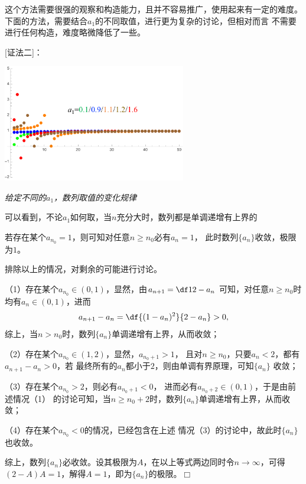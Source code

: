 这个方法需要很强的观察和构造能力，且并不容易推广，使用起来有一定的难度。
下面的方法，需要结合$a_1$的不同取值，进行更为复杂的讨论，但相对而言
不需要进行任何构造，难度略微降低了一些。

[证法二]：
\begin{center}
	\includegraphics[width=8cm]{./images/ch1/a2a.pdf}
	
	\it 给定不同的$a_1$，数列取值的变化规律
	
	可以看到，不论$a_1$如何取，当$n$充分大时，数列都是单调递增有上界的
\end{center}

若存在某个$a_{n_0}=1$，则可知对任意$n\geq n_0$必有$a_n=1$，
此时数列$\{a_n\}$收敛，极限为$1$。

排除以上的情况，对剩余的可能进行讨论。

（1）存在某个$a_{n_0}\in(0,1)$，显然，由$a_{n+1}=\df1{2-a_n}$
可知，对任意$n\geq n_0$时均有$a_n\in(0,1)$，进而
$$a_{n+1}-a_n=\df{(1-a_n)^2}{2-a_n}>0,$$
综上，当$n>n_0$时，数列$\{a_n\}$单调递增有上界，从而收敛；

（2）存在某个$a_{n_0}\in(1,2)$，显然，$a_{n_0+1}>1$，
且对$n\geq n_0$，只要$a_n<2$，都有$a_{n+1}-a_n>0$，若
最终所有的$a_n$都小于$2$，则由单调有界原理，可知$\{a_n\}$
收敛；

（3）存在某个$a_{n_0}>2$，则必有$a_{n_0+1}<0$，
进而必有$a_{n_0+2}\in(0,1)$，于是由前述情况（1）
的讨论可知，当$n\geq n_0+2$时，数列$\{a_n\}$单调递增有上界，从而收敛；

（4）存在某个$a_{n_0}<0$的情况，已经包含在上述
情况（3）的讨论中，故此时$\{a_n\}$也收敛。

综上，数列$\{a_n\}$必收敛。设其极限为$A$，在以上等式两边同时令$n\to\infty$，可得
$(2-A)A=1$，解得$A=1$，即为$\{a_n\}$的极限。\hfill$\Box$

